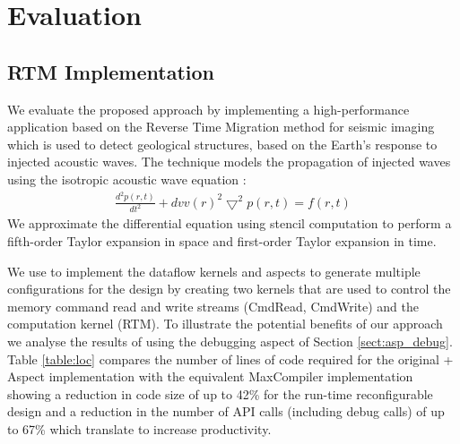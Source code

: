 \section{Evaluation}

\subsection{RTM Implementation}
We evaluate the proposed approach by implementing a high-performance
application based on the Reverse Time Migration method for seismic
imaging which is used to detect geological structures, based on the
Earth's response to injected acoustic waves. The technique models the
propagation of injected waves using the isotropic acoustic wave
equation \cite{araya2011assessing}:
\begin{align}
\frac{d^2p(r,t)}{dt^2} + {dvv(r)}^2\bigtriangledown^2p(r,t) = f(r,t)
\end{align}
We approximate the differential equation using stencil computation to
perform a fifth-order Taylor expansion in space and first-order Taylor
expansion in time.

We use \MAXC{} to implement the dataflow kernels and aspects to generate
multiple configurations for the design by creating two kernels that
are used to control the memory command read and write streams
(CmdRead, CmdWrite) and the computation kernel (RTM).  To illustrate
the potential benefits of our approach we analyse the results of using
the debugging aspect of Section \ref{sect:asp_debug}. Table
\ref{table:loc} compares the number of lines of code required for the
original \MAXC{} + Aspect implementation with the equivalent MaxCompiler
implementation showing a reduction in code size of up to 42\% for the
run-time reconfigurable design and a reduction in the number of API
calls (including debug calls) of up to 67\% which translate to
increase productivity.

